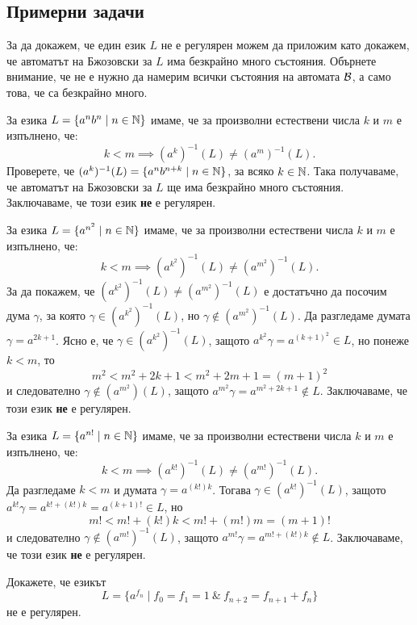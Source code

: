 \subsection{Примерни задачи}

За да докажем, че един език $L$ не е регулярен можем да приложим 
като докажем, че автоматът на Бжозовски за $L$ има безкрайно много състояния.
Обърнете внимание, че не е нужно да намерим всички състояния на автомата $\mathcal{B}$, а само това, че са безкрайно много.

\begin{example}
  За езика $L = \{a^nb^n\mid n \in \mathbb{N}\}$ имаме, че за произволни естествени числа $k$ и $m$ е изпълнено, че:
  \[k < m \implies (a^k)^{-1}(L) \neq (a^m)^{-1}(L).\]
  Проверете, че $(a^k)^{-1}(L) = \{a^{n}b^{n+k} \mid n\in\mathbb{N}\}$, за всяко $k \in \mathbb{N}$.
  Така получаваме, че автоматът на Бжозовски за $L$ ще има безкрайно много състояния.
  Заключаваме, че този език {\bf не} е регулярен.
\end{example}

\begin{example}
  За езика $L = \{a^{n^2} \mid n \in \mathbb{N}\}$ имаме, че за произволни естествени числа $k$ и $m$ е изпълнено, че:
  \[k < m \implies (a^{k^2})^{-1}(L) \neq (a^{m^2})^{-1}(L).\]
  За да покажем, че $(a^{k^2})^{-1}(L) \neq (a^{m^2})^{-1}(L)$ е достатъчно да посочим дума $\gamma$, за която $ \gamma \in (a^{k^2})^{-1}(L)$, но $\gamma \not\in (a^{m^2})^{-1}(L)$.
  Да разгледаме думата $\gamma = a^{2k+1}$. Ясно е, че $\gamma \in (a^{k^2})^{-1}(L)$, защото $a^{k^2}\gamma = a^{(k+1)^2} \in L$, но понеже $k < m$, то
  \[m^2 < m^2 + 2k + 1 < m^2 + 2m + 1 = (m+1)^2\]
  и следователно $\gamma \not\in (a^{m^2})(L)$, защото $a^{m^2}\gamma = a^{m^2+2k+1}\not\in L$.
  Заключаваме, че този език {\bf не} е регулярен.
\end{example}

\begin{example}
  За езика $L = \{a^{n!} \mid n \in \mathbb{N}\}$ имаме, че за произволни естествени числа $k$ и $m$ е изпълнено, че:
  \[k < m \implies (a^{k!})^{-1}(L) \neq (a^{m!})^{-1}(L).\]
  Да разгледаме $k < m$ и думата $\gamma = a^{(k!)k}$.
  Тогава $\gamma \in (a^{k!})^{-1}(L)$, защото $a^{k!}\gamma = a^{k! + (k!)k} = a^{(k+1)!} \in L$, но 
  \[m! < m! + (k!)k < m! + (m!)m = (m+1)!\]
  и следователно $\gamma \not\in (a^{m!})^{-1}(L)$, защото $a^{m!}\gamma = a^{m!+(k!)k}\not\in L$.
  Заключаваме, че този език {\bf не} е регулярен.
\end{example}

\begin{problem}
  Докажете, че езикът 
  \[L = \{a^{f_n} \mid f_0 = f_1 = 1\ \&\ f_{n+2} = f_{n+1} + f_{n}\}\]
  не е регулярен.
\end{problem}

